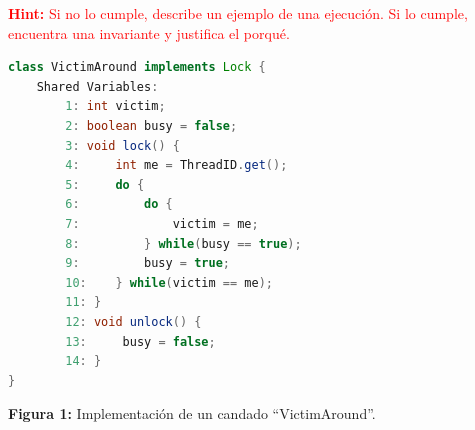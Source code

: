     \textcolor{red}{\textbf{Hint:} Si no lo cumple, describe un ejemplo de una ejecución. Si lo cumple, encuentra una invariante y justifica el porqué.}

    \begin{lstlisting}[language=Java]
class VictimAround implements Lock {
    Shared Variables:
        1: int victim;
        2: boolean busy = false;
        3: void lock() {
        4:     int me = ThreadID.get();
        5:     do {
        6:         do {
        7:             victim = me;
        8:         } while(busy == true);
        9:         busy = true;
        10:    } while(victim == me);
        11: }
        12: void unlock() {
        13:     busy = false;
        14: }
}
    \end{lstlisting}

    \begin{center}
        \textbf{Figura 1:} Implementación de un candado ``VictimAround''.
    \end{center}







